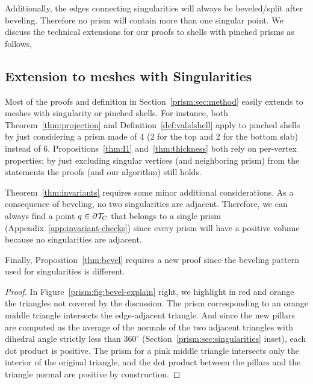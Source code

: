 Additionally, the edges connecting singularities will always be beveled/split after beveling. Therefore no prism will contain more than one singular point.
We discuss the technical extensions for our proofs to shells with pinched prisms as follows,

\subsection{Extension to meshes with Singularities}\label{sec:extend-singularity}
Most of the proofs and definition in Section~\ref{prism:sec:method} easily extends to meshes with singularity or pinched shells. For instance,
{both} Theorem~\ref{thm:projection} and Definition~\ref{def:validshell} apply to pinched shells by just considering a prism made of 4 (2 for the top and 2 for the bottom slab) instead of 6. Propositions~\ref{thm:I1} and~\ref{thm:thickness} both rely on per-vertex properties; by just excluding singular vertices (and neighboring prism) from the statements the proofs (and our algorithm) still holds.


Theorem~\ref{thm:invariants} requires some minor additional considerations. As a consequence of beveling, no two singularities are adjacent. Therefore, we can always find a point $q \in \partial \mathcal{T}_C$ that belongs to a single prism (Appendix~\ref{app:invariant-checks}) since every prism will have a positive volume
because no singularities are adjacent.


Finally, Proposition~\ref{thm:bevel} requires a new proof since the beveling pattern used for singularities is different.
\begin{proof}
In  Figure~\ref{prism:fig:bevel-explain} right, we highlight in red and orange the triangles not covered by the discussion. 
The prism corresponding to an orange middle triangle intersects the edge-adjacent triangle. And since the new pillars are computed as the average of the normals of the two adjacent triangles with dihedral angle strictly less than $360^\circ$ 
 (Section~\ref{prism:sec:singularities} inset), each dot product is positive. 
The prism {for} a pink middle triangle intersects only the interior of the original triangle, and the dot product between the pillars and the triangle normal are positive by construction. 
\end{proof}



